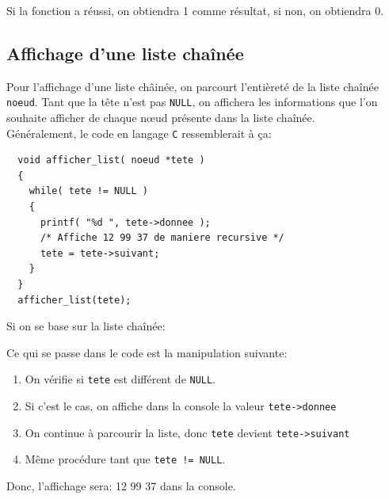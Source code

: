 \documentclass[11pt]{article}
\begin{document}
Si la fonction a réussi, on obtiendra 1 comme résultat, si non, on obtiendra 0.

\subsection{Affichage d'une liste chaînée}

Pour l'affichage d'une liste châinée, on parcourt l'entièreté de la liste chaînée \texttt{noeud}. Tant que la tête n'est pas \texttt{NULL}, on affichera les informations que l'on souhaite afficher de chaque n\oe{}ud présente dans la liste chaînée.\\
Généralement, le code en langage \texttt{C} ressemblerait à ça:
\begin{lstlisting}
  void afficher_list( noeud *tete )
  {
    while( tete != NULL )
    {
      printf( "%d ", tete->donnee );
      /* Affiche 12 99 37 de maniere recursive */
      tete = tete->suivant;
    }
  }
  afficher_list(tete);
\end{lstlisting}

Si on se base sur la liste chaînée:

Ce qui se passe dans le code est la manipulation suivante:
\begin{enumerate}
\item On vérifie si \texttt{tete} est différent de \texttt{NULL}.
\item Si c'est le cas, on affiche dans la console la valeur \texttt{tete->donnee}
\item On continue à parcourir la liste, donc \texttt{tete} devient \texttt{tete->suivant}
\item Même procédure tant que \texttt{tete != NULL}.
\end{enumerate}

Donc, l'affichage sera: 12 99 37 dans la console.
\end{document}
